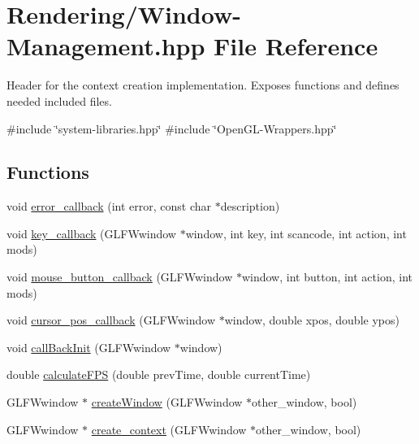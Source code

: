 \hypertarget{Window-Management_8hpp}{}\section{Rendering/\+Window-\/\+Management.hpp File Reference}
\label{Window-Management_8hpp}


Header for the context creation implementation. Exposes functions and defines needed included files.  


{\ttfamily \#include \char`\"{}system-\/libraries.\+hpp\char`\"{}}\newline
{\ttfamily \#include \char`\"{}Open\+G\+L-\/\+Wrappers.\+hpp\char`\"{}}\newline
\subsection*{Functions}
\begin{DoxyCompactItemize}
\item 
void \mbox{\hyperlink{Window-Management_8hpp_a4ee391c8bab624943c822faafb2c320e}{error\+\_\+callback}} (int error, const char $\ast$description)
\item 
void \mbox{\hyperlink{Window-Management_8hpp_a286930f4e8ede059b83ff6eafa2ff718}{key\+\_\+callback}} (G\+L\+F\+Wwindow $\ast$window, int key, int scancode, int action, int mods)
\item 
void \mbox{\hyperlink{Window-Management_8hpp_a5515d805e76ce6728de3c0dc5e187c86}{mouse\+\_\+button\+\_\+callback}} (G\+L\+F\+Wwindow $\ast$window, int button, int action, int mods)
\item 
void \mbox{\hyperlink{Window-Management_8hpp_ab9a970cff09c5a4031b814242706b4f6}{cursor\+\_\+pos\+\_\+callback}} (G\+L\+F\+Wwindow $\ast$window, double xpos, double ypos)
\item 
void \mbox{\hyperlink{Window-Management_8hpp_a49a5ff4f2fc2d79e62443424b32433ec}{call\+Back\+Init}} (G\+L\+F\+Wwindow $\ast$window)
\item 
double \mbox{\hyperlink{Window-Management_8hpp_aa684abe4ed14277927421e1926ab67eb}{calculate\+F\+PS}} (double prev\+Time, double current\+Time)
\item 
G\+L\+F\+Wwindow $\ast$ \mbox{\hyperlink{Window-Management_8hpp_a9877855b1f20b67790eeace6c28ec048}{create\+Window}} (G\+L\+F\+Wwindow $\ast$other\+\_\+window, bool)
\item 
G\+L\+F\+Wwindow $\ast$ \mbox{\hyperlink{Window-Management_8hpp_a556d3732df6c5c8329942c50599a0f0f}{create\+\_\+context}} (G\+L\+F\+Wwindow $\ast$other\+\_\+window, bool)
\end{DoxyCompactItemize}


